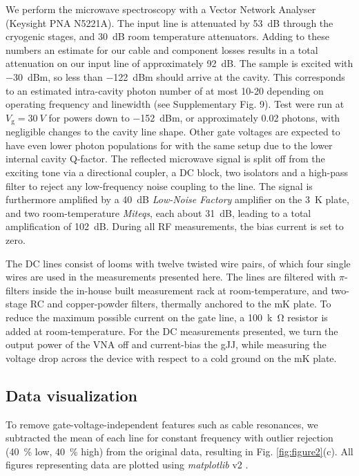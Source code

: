 We perform the microwave spectroscopy with a Vector Network Analyser (Keysight PNA N5221A).
The input line is attenuated by \SI{53}{dB} through the cryogenic stages, and \SI{30}{dB} room temperature attenuators.
Adding to these numbers an estimate for our cable and component losses results in a total attenuation on our input line of approximately \SI{92}{dB}.
The sample is excited with \SI{-30}{dBm}, so less than \SI{-122}{dBm} should arrive at the cavity.
This corresponds to an estimated intra-cavity photon number of at most 10-20 depending on operating frequency and linewidth (see Supplementary Fig. 9).
Test were run at $V_\text{g} = \SI{30}{V}$ for powers down to \SI{-152}{dBm}, or approximately 0.02 photons, with negligible changes to the cavity line shape.
Other gate voltages are expected to have even lower photon populations for with the same setup due to the lower internal cavity Q-factor.
The reflected microwave signal is split off from the exciting tone via a directional coupler, a DC block, two isolators and a high-pass filter to reject any low-frequency noise coupling to the line.
The signal is furthermore amplified by a \SI{40}{dB} \textit{Low-Noise Factory} amplifier on the \SI{3}{K} plate, and two room-temperature \textit{Miteqs}, each about \SI{31}{dB}, leading to a total amplification of \SI{102}{dB}.
During all RF measurements, the bias current is set to zero.

The DC lines consist of looms with twelve twisted wire pairs, of which four single wires are used in the measurements presented here.
The lines are filtered with $\pi$-filters inside the in-house built measurement rack at room-temperature, and two-stage RC and copper-powder filters, thermally anchored to the mK plate.
To reduce the maximum possible current on the gate line, a \SI{100}{k\ohm} resistor is added at room-temperature.
For the DC measurements presented, we turn the output power of the VNA off and current-bias the gJJ, while measuring the voltage drop across the device with respect to a cold ground on the mK plate.

\subsection{Data visualization}
To remove gate-voltage-independent features such as cable resonances, we subtracted the mean of each line for constant frequency with outlier rejection (\SI{40}{\percent} low, \SI{40}{\percent} high) from the original data, resulting in Fig. \ref{fig:figure2}(c).
All figures representing data are plotted using \textit{matplotlib} v2 \cite{hunterMatplotlib2DGraphics2007}.

